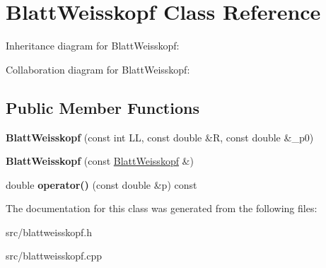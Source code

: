\hypertarget{class_blatt_weisskopf}{}\section{Blatt\+Weisskopf Class Reference}
\label{class_blatt_weisskopf}


Inheritance diagram for Blatt\+Weisskopf\+:


Collaboration diagram for Blatt\+Weisskopf\+:
\subsection*{Public Member Functions}
\begin{DoxyCompactItemize}
\item 
\hypertarget{class_blatt_weisskopf_a144a0ee8326b5310cfa1244338758d00}{}{\bfseries Blatt\+Weisskopf} (const int L\+L, const double \&R, const double \&\+\_\+p0)\label{class_blatt_weisskopf_a144a0ee8326b5310cfa1244338758d00}

\item 
\hypertarget{class_blatt_weisskopf_a8a9bb4acdef603d5c6f563649f84cbd7}{}{\bfseries Blatt\+Weisskopf} (const \hyperlink{class_blatt_weisskopf}{Blatt\+Weisskopf} \&)\label{class_blatt_weisskopf_a8a9bb4acdef603d5c6f563649f84cbd7}

\item 
\hypertarget{class_blatt_weisskopf_a01bd02ec5ef40a900791f9bd614df2b4}{}double {\bfseries operator()} (const double \&p) const \label{class_blatt_weisskopf_a01bd02ec5ef40a900791f9bd614df2b4}

\end{DoxyCompactItemize}


The documentation for this class was generated from the following files\+:\begin{DoxyCompactItemize}
\item 
src/blattweisskopf.\+h\item 
src/blattweisskopf.\+cpp\end{DoxyCompactItemize}
